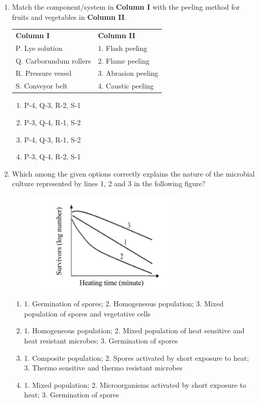 \documentclass[journal,12pt,onecolumn]{IEEEtran}
\begin{document}
\begin{enumerate}[label=\arabic*.,resume]
\item Match the component/system in \textbf{Column I} with the peeling method for fruits and vegetables in \textbf{Column II}.
\begin{table}[H]
\centering
\begin{tabular}{ll}
\textbf{Column I} & \textbf{Column II} \\
P. Lye solution & 1. Flash peeling \\
Q. Carborundum rollers & 2. Flame peeling \\
R. Pressure vessel & 3. Abrasion peeling \\
S. Conveyor belt & 4. Caustic peeling \\
\end{tabular}
\end{table}

\begin{multicols}{2}
\begin{enumerate}[label=(\Alph*)]
\item P-4, Q-3, R-2, S-1
\item P-3, Q-4, R-1, S-2
\item P-4, Q-3, R-1, S-2
\item P-3, Q-4, R-2, S-1
\end{enumerate}
\end{multicols}

\item Which among the given options correctly explains the nature of the microbial culture represented by lines 1, 2 and 3 in the following figure?
\begin{figure}[H]
\centering
\includegraphics[width=0.7\textwidth]{FIG/U-16.png}
\caption*{}
\label{U-16}
\end{figure}

\begin{enumerate}[label=(\Alph*)]
\item 1. Germination of spores; 2. Homogeneous population; 3. Mixed population of spores and vegetative cells
\item 1. Homogeneous population; 2. Mixed population of heat sensitive and heat resistant microbes; 3. Germination of spores
\item 1. Composite population; 2. Spores activated by short exposure to heat; 3. Thermo sensitive and thermo resistant microbes
\item 1. Mixed population; 2. Microorganisms activated by short exposure to heat; 3. Germination of spores
\end{enumerate}


\end{enumerate}
\end{document}
